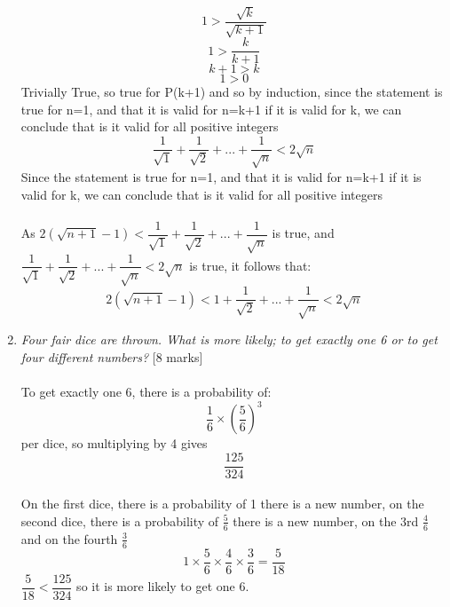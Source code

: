 \documentclass{article}[18pt]
\begin{document}
\begin{enumerate}
$$1>\dfrac{\sqrt{k}}{\sqrt{k+1}}$$
$$1>\dfrac{k}{k+1}$$
$$k+1>k$$
$$1>0$$
Trivially True, so true for P(k+1) and so by induction, since the statement is true for n=1, and that it is valid for n=k+1 if it is valid for k, we can conclude that is it valid for all positive integers \\
$$\dfrac{1}{\sqrt{1}}+\dfrac{1}{\sqrt{2}}+...+\dfrac{1}{\sqrt{n}}<2\sqrt{n}$$
Since the statement is true for n=1, and that it is valid for n=k+1 if it is valid for k, we can conclude that is it valid for all positive integers \\
\\
As $2(\sqrt{n+1}-1)<\dfrac{1}{\sqrt{1}}+\dfrac{1}{\sqrt{2}}+...+\dfrac{1}{\sqrt{n}}$ is true, and $\dfrac{1}{\sqrt{1}}+\dfrac{1}{\sqrt{2}}+...+\dfrac{1}{\sqrt{n}}<2\sqrt{n}$ is true, it follows that:
	$$2(\sqrt{n+1}-1)<1+\dfrac{1}{\sqrt{2}}+...+\dfrac{1}{\sqrt{n}}<2\sqrt{n}$$







\newpage
	\item \textit{Four fair dice are thrown. What is more likely; to get exactly one 6 or to get four different numbers?} \hfill [8 marks]\\
	\\
	To get exactly one 6, there is a probability of:
	$$\dfrac{1}{6}\times(\frac{5}{6})^3$$
	per dice, so multiplying by 4 gives
	$$\dfrac{125}{324}$$
	\\
	On the first dice, there is a probability of 1 there is a new number, on the second dice, there is a probability of $\frac{5}{6}$ there is a new number, on the 3rd $\frac{4}{6}$ and on the fourth $\frac{3}{6}$
	$$1\times\frac{5}{6}\times \frac{4}{6}\times\frac{3}{6}=\frac{5}{18}$$
	$\dfrac{5}{18}<\dfrac{125}{324}$ so it is more likely to get one 6.
	
	
	
	
	

\end{enumerate}
\end{document}
